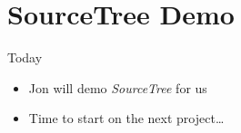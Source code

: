 \documentclass{beamer}
\begin{document}
\section[]{SourceTree Demo} 
\begin{frame}{Today}
\begin{itemize}
\item Jon will demo \emph{SourceTree} for us
\item Time to start on the next project\ldots
\end{itemize}
\end{frame}
\end{document}
